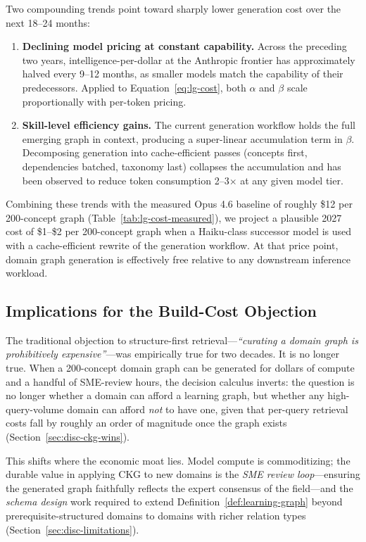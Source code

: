 Two compounding trends point toward sharply lower generation cost over
the next 18--24 months:

\begin{enumerate}
  \item \textbf{Declining model pricing at constant capability.} Across
    the preceding two years, intelligence-per-dollar at the Anthropic
    frontier has approximately halved every 9--12 months, as smaller
    models match the capability of their predecessors. Applied to
    Equation~\ref{eq:lg-cost}, both $\alpha$ and $\beta$ scale
    proportionally with per-token pricing.
  \item \textbf{Skill-level efficiency gains.} The current generation
    workflow holds the full emerging graph in context, producing a
    super-linear accumulation term in $\beta$. Decomposing generation
    into cache-efficient passes (concepts first, dependencies batched,
    taxonomy last) collapses the accumulation and has been observed to
    reduce token consumption 2--3$\times$ at any given model tier.
\end{enumerate}

Combining these trends with the measured Opus 4.6 baseline of roughly
\$12 per 200-concept graph (Table~\ref{tab:lg-cost-measured}), we project
a plausible 2027 cost of \$1--\$2 per 200-concept graph when a
Haiku-class successor model is used with a cache-efficient rewrite of
the generation workflow. At that price point, domain graph generation
is effectively free relative to any downstream inference workload.

\subsection{Implications for the Build-Cost Objection}\label{sec:lg-implications}

The traditional objection to structure-first retrieval---\emph{``curating a
domain graph is prohibitively expensive''}---was empirically true for
two decades. It is no longer true. When a 200-concept domain graph can be
generated for dollars of compute and a handful of SME-review hours, the
decision calculus inverts: the question is no longer whether a domain can
afford a learning graph, but whether any high-query-volume domain can
afford \emph{not} to have one, given that per-query retrieval costs fall
by roughly an order of magnitude once the graph exists
(Section~\ref{sec:disc-ckg-wins}).

This shifts where the economic moat lies. Model compute is commoditizing;
the durable value in applying CKG to new domains is the
\emph{SME review loop}---ensuring the generated graph faithfully reflects
the expert consensus of the field---and the \emph{schema design} work
required to extend Definition~\ref{def:learning-graph} beyond
prerequisite-structured domains to domains with richer relation types
(Section~\ref{sec:disc-limitations}).
